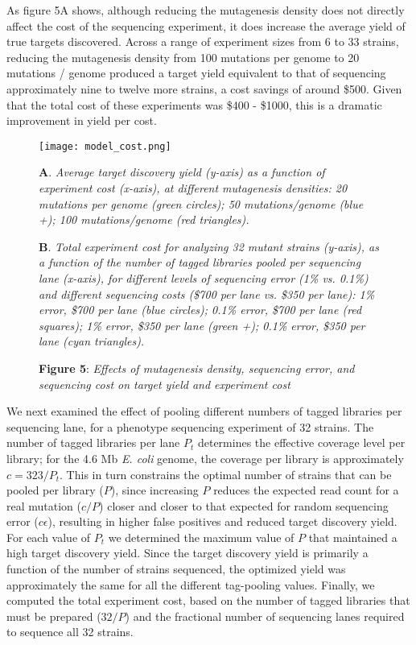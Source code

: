 \documentclass[letterpaper,10pt,english]{howto}
\begin{document}
As figure 5A shows, although reducing the mutagenesis density
does not directly affect the cost of the sequencing experiment,
it does increase the average yield of true targets discovered.
Across a range of experiment sizes from 6 to 33 strains,
reducing the mutagenesis density from 100 mutations per genome
to 20 mutations / genome produced a target yield equivalent to
that of sequencing approximately nine to twelve more strains, a cost savings of
around \$500.  Given that the total cost of these experiments
was \$400 - \$1000, this is a dramatic improvement in yield per
cost.
\hypertarget{modelcostfig}{}\begin{figure}[htbp]
\centering

\texttt{[image: model\_cost.png]}
\caption{\textbf{Figure 5}: \emph{Effects of mutagenesis density, sequencing error,
and sequencing cost on target yield and experiment cost}}{\small 
\textbf{A}. \emph{Average target discovery yield (y-axis) as a function of experiment
cost (x-axis), at different mutagenesis densities: 20 mutations per genome
(green circles); 50 mutations/genome (blue +); 100 mutations/genome
(red triangles).}

\textbf{B}. \emph{Total experiment cost for analyzing 32 mutant strains
(y-axis), as a function of the number
of tagged libraries pooled per sequencing lane (x-axis), for different
levels of sequencing error (1\% vs. 0.1\%) and different sequencing
costs (\$700 per lane vs. \$350 per lane): 1\% error, \$700 per lane
(blue circles); 0.1\% error, \$700 per lane (red squares);
1\% error, \$350 per lane (green +); 0.1\% error, \$350 per lane (cyan
triangles).}
}\end{figure}

We next examined the effect of pooling different numbers of
tagged libraries per sequencing lane, for a phenotype
sequencing experiment of 32 strains.  The number of tagged libraries
per lane $P_t$ determines the effective coverage level
per library; for the 4.6 Mb \emph{E. coli} genome, the coverage
per library is approximately $c=323/P_t$.  This in turn
constrains the optimal number of strains that can be pooled
per library ($P$), since increasing $P$ reduces
the expected read count for a real mutation ($c/P$)
closer and closer to that expected for random sequencing
error ($c\epsilon$), resulting in higher false positives
and reduced target discovery yield.  For each value of $P_t$ we
determined the maximum value of $P$ that maintained a
high target discovery yield.  Since the target discovery yield
is primarily a function of the number of strains sequenced,
the optimized yield was approximately the same for all
the different tag-pooling values.
Finally, we computed the total experiment
cost, based on the number of tagged libraries that must be
prepared ($32/P$) and the fractional number of sequencing
lanes required to sequence all 32 strains.
\end{document}
